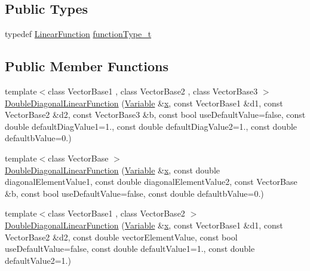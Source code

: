 \subsection*{Public Types}
\begin{DoxyCompactItemize}
\item 
typedef \hyperlink{classocra_1_1LinearFunction}{Linear\+Function} \hyperlink{classocra_1_1DoubleDiagonalLinearFunction_a69a17b7aa1e34b31ac1cc18cca3a3b38}{function\+Type\+\_\+t}
\end{DoxyCompactItemize}
\subsection*{Public Member Functions}
\begin{DoxyCompactItemize}
\item 
{\footnotesize template$<$class Vector\+Base1 , class Vector\+Base2 , class Vector\+Base3 $>$ }\\\hyperlink{classocra_1_1DoubleDiagonalLinearFunction_a790df03af5df25353682965f7a556aec}{Double\+Diagonal\+Linear\+Function} (\hyperlink{classocra_1_1Variable}{Variable} \&\hyperlink{classocra_1_1Function_a28825886d1f149c87b112ec2ec1dd486}{x}, const Vector\+Base1 \&d1, const Vector\+Base2 \&d2, const Vector\+Base3 \&b, const bool use\+Default\+Value=false, const double default\+Diag\+Value1=1., const double default\+Diag\+Value2=1., const double defaultb\+Value=0.)
\item 
{\footnotesize template$<$class Vector\+Base $>$ }\\\hyperlink{classocra_1_1DoubleDiagonalLinearFunction_a96c59d997d8ec798745389d98c2d5e63}{Double\+Diagonal\+Linear\+Function} (\hyperlink{classocra_1_1Variable}{Variable} \&\hyperlink{classocra_1_1Function_a28825886d1f149c87b112ec2ec1dd486}{x}, const double diagonal\+Element\+Value1, const double diagonal\+Element\+Value2, const Vector\+Base \&b, const bool use\+Default\+Value=false, const double defaultb\+Value=0.)
\item 
{\footnotesize template$<$class Vector\+Base1 , class Vector\+Base2 $>$ }\\\hyperlink{classocra_1_1DoubleDiagonalLinearFunction_a7403903ccd31cec18bf665aefd1f4900}{Double\+Diagonal\+Linear\+Function} (\hyperlink{classocra_1_1Variable}{Variable} \&\hyperlink{classocra_1_1Function_a28825886d1f149c87b112ec2ec1dd486}{x}, const Vector\+Base1 \&d1, const Vector\+Base2 \&d2, const double vector\+Element\+Value, const bool use\+Default\+Value=false, const double default\+Value1=1., const double default\+Value2=1.)

\end{DoxyCompactItemize}

